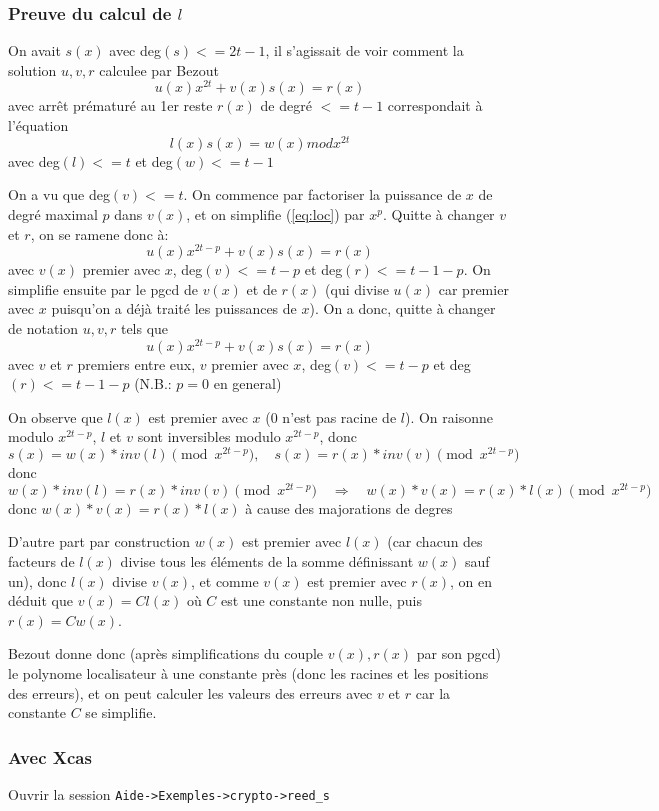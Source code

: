 \documentclass[a4paper,11pt]{article}
\begin{document}
\subsubsection{Preuve du calcul de $l$}
On avait $s(x)$ avec deg$(s)<=2t-1$,
il s'agissait de voir comment la solution $u,v,r$ calculee par Bezout
\begin{equation}   \label{eq:loc}
 u(x)  x^{2t}+ v(x) s(x) = r(x) 
\end{equation}
avec arr\^et pr\'ematur\'e au 1er reste $r(x)$ de degr\'e $<=t-1$ 
correspondait \`a l'\'equation
\[   l(x) s(x) = w(x) mod x^{2t} \]
avec deg$(l)<=t$ et deg$(w)<=t-1$

On a vu que deg$(v)<=t$.
On commence par factoriser la puissance de $x$ de degr\'e maximal $p$ dans
$v(x)$, et on simplifie (\ref{eq:loc}) par $x^p$. 
Quitte \`a changer $v$ et $r$, on se
ramene donc \`a:
\[   u(x)  x^{2t-p}+ v(x) s(x) = r(x) \]
avec $v(x)$ premier avec $x$, deg$(v)<= t-p$ et deg$(r)<= t-1-p$.
On simplifie ensuite par le pgcd de $v(x)$ et de $r(x)$
(qui divise $u(x)$ car premier avec $x$ puisqu'on a d\'ej\`a trait\'e les
puissances de $x$).
On a donc, quitte \`a changer de notation $u,v,r$ tels que
\[  u(x)  x^{2t-p}+ v(x) s(x) = r(x) \]
avec $v$ et $r$ premiers entre eux, $v$ premier avec $x$,
deg$(v)<=t-p$ et deg$(r)<=t-1-p$ (N.B.: $p=0$ en general)

On observe que $l(x)$ est premier avec $x$ ($0$ n'est pas racine de $l$).
On raisonne modulo $x^{2t-p}$, $l$ et $v$ sont inversibles modulo $x^{2t-p}$,
donc 
\[ s(x) = w(x)*inv(l) \pmod{ x^{2t-p}},
\quad s(x) = r(x)*inv(v) \pmod {x^{2t-p}} \]
donc 
\[ w(x)*inv(l)=r(x)*inv(v) \pmod{x^{2t-p}} 
\quad \Rightarrow \quad w(x)*v(x)=r(x)*l(x) \pmod {x^{2t-p}} \]
donc $w(x)*v(x)=r(x)*l(x)$ \`a cause des majorations de degres

D'autre part par construction $w(x)$ est premier avec $l(x)$ (car chacun
des facteurs de $l(x)$ divise tous les \'el\'ements de la somme d\'efinissant
$w(x)$ sauf un), donc $l(x)$ divise $v(x)$, et comme $v(x)$ est premier
avec $r(x)$, on en d\'eduit que $v(x)=C l(x)$ o\`u $C$ est une constante non
nulle, puis $r(x) = C w(x)$.

Bezout donne donc (apr\`es simplifications du couple $v(x), r(x)$ par
son pgcd) le polynome localisateur \`a une constante pr\`es (donc les
racines et les positions des erreurs), et on peut calculer
les valeurs des erreurs avec $v$ et $r$ car la constante $C$ se simplifie.

\subsubsection{Avec Xcas}
Ouvrir la session \verb|Aide->Exemples->crypto->reed_s|
\end{document}
